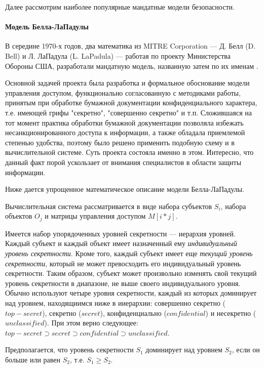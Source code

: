 Далее рассмотрим наиболее популярные мандатные модели безопасности.

\paragraph{Модель Белла-ЛаПадулы}

В середине 1970-х годов, два математика из MITRE Corporation --- Д. Белл (D. Bell) и Л. ЛаПадула (L. LaPadula) --- работая по проекту Министерства Обороны США, разработали мандатную модель, названную затем по их именам \cite{BellLaPadulaModel}.

Основной задачей проекта была разработка и формальное обоснование модели управления доступом, функционально согласованную с методиками работы, принятым при обработке бумажной документации конфиденциального характера, т.е. имеющей грифы "секретно", "совершенно секретно" и т.п. Сложившаяся на тот момент практика обработки бумажной документации позволяла избежать несанкционированного доступа к информации, а также обладала приемлемой степенью удобства, поэтому было решено применить подобную схему и в вычислительной системе. Суть проекта состояла именно в этом. Интересно, что данный факт порой ускользает от внимания специалистов в области защиты информации.

Ниже дается упрощенное математическое описание модели Белла-ЛаПадулы.

Вычислительная система рассматривается в виде набора субъектов $S_{i}$, набора объектов $O_{j}$ и матрицы управления доступом $M[i*j]$.

Имеется набор упорядоченных уровней секретности --- иерархия уровней. Каждый субъект и каждый объект имеет назначенный ему \textit{индивидуальный уровень секретности}. Кроме того, каждый субъект имеет еще \textit{текущий уровень секретности}, который не может превосходить его индивидуальный уровень секретности. Таким образом, субъект может произвольно изменять свой текущий уровень секретности в диапазоне, не выше своего индивидуального уровня. Обычно используют четыре уровня секретности, каждый из которых доминирует над уровнем, находящиимся ниже в ииерархии: совершенно секретно ($top-secret$),  секретно ($secret$),  конфиденциально ($confidential$) и несекретно ($unclassified$).  При этом верно следующее: $ top-secret \supset secret \supset confidential \supset unclassified $.

Предполагается, что уровень секретности $S_1$ доминирует над уровнем $S_2$, если он больше или равен $S_2$, т.е. $S_1 \geq S_2$.


